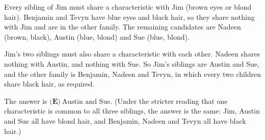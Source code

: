 Every sibling of Jim must share a characteristic with Jim (brown eyes or blond hair). Benjamin and Tevyn have blue eyes and black hair, so they share nothing with Jim and are in the other family. The remaining candidates are Nadeen (brown, black), Austin (blue, blond) and Sue (blue, blond).

Jim's two siblings must also share a characteristic with each other. Nadeen shares nothing with Austin, and nothing with Sue. So Jim's siblings are Austin and Sue, and the other family is Benjamin, Nadeen and Tevyn, in which every two children share black hair, as required.

The answer is $\boxed{\textbf{(E)}\ \text{Austin and Sue}}$. (Under the stricter reading that one characteristic is common to all three siblings, the answer is the same: Jim, Austin and Sue all have blond hair, and Benjamin, Nadeen and Tevyn all have black hair.)
